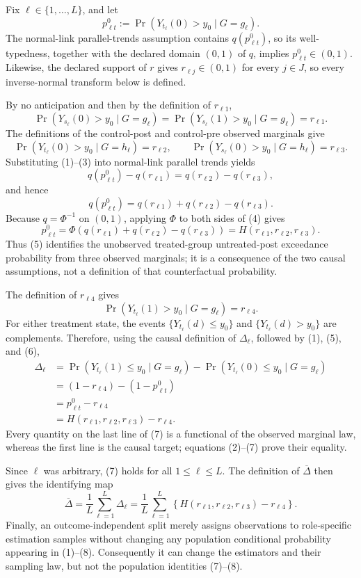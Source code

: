 Fix \(\ell\in\{1,\ldots,L\}\), and let
\[
p^0_{\ell t}:=\Pr\!\left(Y_{t_\ell}(0)>y_0\mid G=g_\ell\right).
\tag{1}
\]
The normal-link parallel-trends assumption contains \(q(p^0_{\ell t})\), so its well-typedness, together with the declared domain \((0,1)\) of \(q\), implies \(p^0_{\ell t}\in(0,1)\).  Likewise, the declared support of \(r\) gives \(r_{\ell j}\in(0,1)\) for every \(j\in J\), so every inverse-normal transform below is defined.

By no anticipation and then by the definition of \(r_{\ell1}\),
\[
\Pr\!\left(Y_{s_\ell}(0)>y_0\mid G=g_\ell\right)
=\Pr\!\left(Y_{s_\ell}(1)>y_0\mid G=g_\ell\right)
=r_{\ell1}.
\tag{2}
\]
The definitions of the control-post and control-pre observed marginals give
\[
\Pr\!\left(Y_{t_\ell}(0)>y_0\mid G=h_\ell\right)=r_{\ell2},
\qquad
\Pr\!\left(Y_{s_\ell}(0)>y_0\mid G=h_\ell\right)=r_{\ell3}.
\tag{3}
\]
Substituting (1)--(3) into normal-link parallel trends yields
\[
q(p^0_{\ell t})-q(r_{\ell1})
=q(r_{\ell2})-q(r_{\ell3}),
\]
and hence
\[
q(p^0_{\ell t})
=q(r_{\ell1})+q(r_{\ell2})-q(r_{\ell3}).
\tag{4}
\]
Because \(q=\Phi^{-1}\) on \((0,1)\), applying \(\Phi\) to both sides of (4) gives
\[
p^0_{\ell t}
=\Phi\!\left(q(r_{\ell1})+q(r_{\ell2})-q(r_{\ell3})\right)
=H(r_{\ell1},r_{\ell2},r_{\ell3}).
\tag{5}
\]
Thus (5) identifies the unobserved treated-group untreated-post exceedance probability from three observed marginals; it is a consequence of the two causal assumptions, not a definition of that counterfactual probability.

The definition of \(r_{\ell4}\) gives
\[
\Pr\!\left(Y_{t_\ell}(1)>y_0\mid G=g_\ell\right)=r_{\ell4}.
\tag{6}
\]
For either treatment state, the events \(\{Y_{t_\ell}(d)\le y_0\}\) and \(\{Y_{t_\ell}(d)>y_0\}\) are complements.  Therefore, using the causal definition of \(\Delta_\ell\), followed by (1), (5), and (6),
\[
\begin{aligned}
\Delta_\ell
&=\Pr\!\left(Y_{t_\ell}(1)\le y_0\mid G=g_\ell\right)
  -\Pr\!\left(Y_{t_\ell}(0)\le y_0\mid G=g_\ell\right)\\
&=(1-r_{\ell4})-(1-p^0_{\ell t})\\
&=p^0_{\ell t}-r_{\ell4}\\
&=H(r_{\ell1},r_{\ell2},r_{\ell3})-r_{\ell4}.
\end{aligned}
\tag{7}
\]
Every quantity on the last line of (7) is a functional of the observed marginal law, whereas the first line is the causal target; equations (2)--(7) prove their equality.

Since \(\ell\) was arbitrary, (7) holds for all \(1\le \ell\le L\).  The definition of \(\overline\Delta\) then gives the identifying map
\[
\overline\Delta
=\frac{1}{L}\sum_{\ell=1}^{L}\Delta_\ell
=\frac{1}{L}\sum_{\ell=1}^{L}
\left\{H(r_{\ell1},r_{\ell2},r_{\ell3})-r_{\ell4}\right\}.
\tag{8}
\]
Finally, an outcome-independent split merely assigns observations to role-specific estimation samples without changing any population conditional probability appearing in (1)--(8).  Consequently it can change the estimators and their sampling law, but not the population identities (7)--(8).
